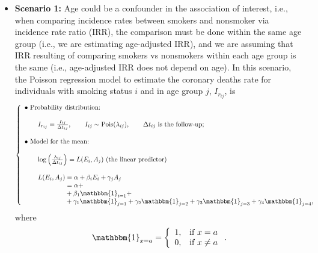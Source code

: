 \documentclass[10pt,a4paper,twoside]{article}\usepackage[]{graphicx}\usepackage[]{xcolor}
\newcommand{\I}{\mathbbm{1}}
\begin{document}
\begin{itemize}
    \item \textbf{Scenario 1:} Age could be a confounder in the association of interest, i.e., when comparing incidence rates between smokers and nonsmoker via incidence rate ratio (IRR), the comparison must be done within the same age group (i.e., we are estimating age-adjusted IRR), and we are assuming that IRR resulting of comparing smokers vs nonsmokers within each age group is the same (i.e., age-adjusted IRR does not depend on age). In this scenario, the Poisson regression model to estimate the coronary deaths rate for individuals with smoking status $i$ and in age group $j$, $I_{r_{ij}}$, is
    \begin{equation}
\label{eq:modelmain}
\left\{
\begin{array}{l}
\bullet\ \text{Probability distribution:} \\ \\
\qquad
I_{r_{ij}}
=
\frac{I_{ij}}{\Delta t_{ij}},
\qquad
I_{ij} \sim  \text{Pois}(\lambda_{ij}),
\qquad
\Delta t_{ij}\text{ is the follow-up;}\\ \\
\bullet\ \text{Model for the mean:} \\ \\
\qquad
\log
\left(
\frac{\lambda_{ij}}{\Delta t_{ij}}
\right)
=
L(E_i, A_j) \text{ (the linear predictor)}\\ \\
\qquad
L(E_i, A_j)
 = 
\alpha + \beta_i E_i + \gamma_j A_j\\
\phantom{
\qquad
L(E_i, A_j)
}
 = 
\alpha + \\
\phantom{
\qquad
L(E_i, A_j)
} + \beta_1 \I_{i=1} + \\
\phantom{
\qquad
L(E_i, A_j)
} + 
\gamma_1 \I_{j=1} +
\gamma_2 \I_{j=2} +
\gamma_3 \I_{j=3} +
\gamma_4 \I_{j=4},
\end{array}
\right.
\end{equation}
where
\begin{equation*}
\I_{x=a}
=
\left\{
\begin{array}{ll}
1, & \text{if } x = a \\
0, & \text{if } x \neq a
\end{array}
\right..
\end{equation*}


\end{itemize}
\end{document}

